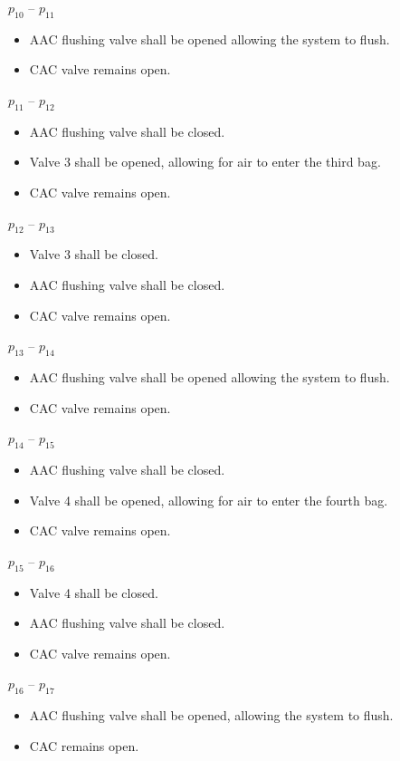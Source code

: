 $p_{10}$ – $p_{11}$
\begin{itemize}
    \item AAC flushing valve shall be opened allowing the system to flush.
    \item CAC valve remains open. 
\end{itemize}
 
  
$p_{11}$ – $p_{12}$
\begin{itemize}
    \item AAC flushing valve shall be closed.
    \item Valve 3 shall be opened, allowing for air to enter the third bag.
    \item CAC valve remains open. 
\end{itemize}

$p_{12}$ – $p_{13}$
\begin{itemize}
    \item Valve 3 shall be closed.
    \item AAC flushing valve shall be closed.
    \item CAC valve remains open.
\end{itemize}

$p_{13}$ – $p_{14}$
\begin{itemize}
    \item AAC flushing valve shall be opened allowing the system to flush.
    \item CAC valve remains open.
\end{itemize}

$p_{14}$ – $p_{15}$
\begin{itemize}
    \item AAC flushing valve shall be closed.
    \item Valve 4 shall be opened, allowing for air to enter the fourth bag.
    \item CAC valve remains open.
\end{itemize}

$p_{15}$ – $p_{16}$
\begin{itemize}
    \item Valve 4 shall be closed.
    \item AAC flushing valve shall be closed.
    \item CAC valve remains open.
\end{itemize}

$p_{16}$ – $p_{17}$
\begin{itemize}
    \item AAC flushing valve shall be opened, allowing the system to flush. 
    \item CAC remains open.
  \end{itemize}

